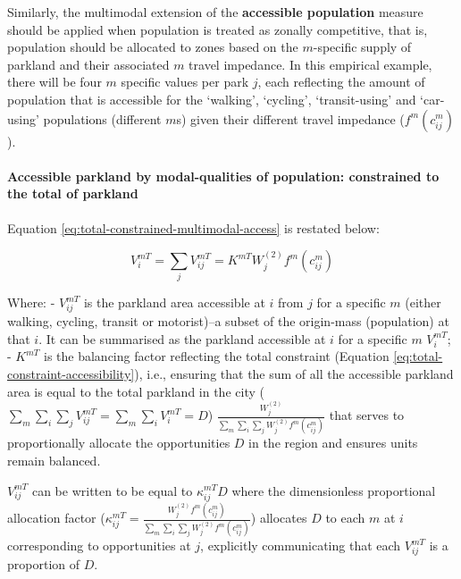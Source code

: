 \documentclass[
11pt, %
oneside, %
english, %
singlespacing, %
]{macthesis} %
\begin{document}
Similarly, the multimodal extension of the \textbf{accessible population} measure should be applied when population is treated as zonally competitive, that is, population should be allocated to zones based on the \(m\)-specific supply of parkland and their associated \(m\) travel impedance. In this empirical example, there will be four \(m\) specific values per park \(j\), each reflecting the amount of population that is accessible for the `walking', `cycling', `transit-using' and `car-using' populations (different \(m\)s) given their different travel impedance (\(f^m(c^m_{ij})\)).

\paragraph{Accessible parkland by modal-qualities of population: constrained to the total of parkland}\label{accessible-parkland-by-modal-qualities-of-population-constrained-to-the-total-of-parkland}

Equation \ref{eq:total-constrained-multimodal-access} is restated below:

\begin{equation}
\label{eq:total-constrained-multimodal-access}
V^{mT}_{i} = \sum_j V^{mT}_{ij} = K^{mT} W_j^{(2)} f^m(c^m_{ij})
\end{equation} 

Where:
- \(V^{mT}_{ij}\) is the parkland area accessible at \(i\) from \(j\) for a specific \(m\) (either walking, cycling, transit or motorist)--a subset of the origin-mass (population) at that \(i\). It can be summarised as the parkland accessible at \(i\) for a specific \(m\) \(V^{mT}_{i}\);
- \(K^{mT}\) is the balancing factor reflecting the total constraint (Equation \ref{eq:total-constraint-accessibility}), i.e., ensuring that the sum of all the accessible parkland area is equal to the total parkland in the city (\(\sum_m\sum_i\sum_j V^{mT}_{ij} = \sum_m \sum_i V^{mT}_{i} = D\)) \(\frac{W^{(2)}_j}{\sum_m\sum_i\sum_j W^{(2)}_jf^m(c^m_{ij})}\) that serves to proportionally allocate the opportunities \(D\) in the region and ensures units remain balanced.

\(V_{ij}^{mT}\) can be written to be equal to \(\kappa_{ij}^{mT} D\) where the dimensionless proportional allocation factor (\(\kappa_{ij}^{mT} = \frac{W_j^{(2)} f^m(c^m_{ij})}{\sum_m\sum_i\sum_j W^{(2)}_jf^m(c^m_{ij})}\)) allocates \(D\) to each \(m\) at \(i\) corresponding to opportunities at \(j\), explicitly communicating that each \(V_{ij}^{mT}\) is a proportion of \(D\).
\end{document}
